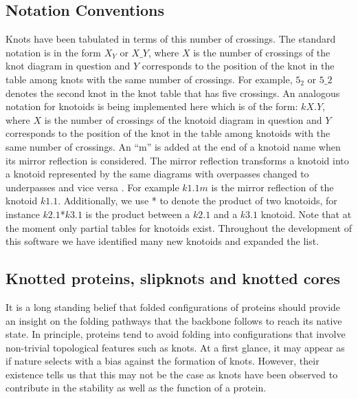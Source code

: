 \subsection{\label{sec:theory:notations}Notation Conventions}
Knots have been tabulated in terms of this number of crossings\cite{Rolfsen1976, Adams}. The standard notation is in the form $X_Y$ or $X\_ Y$, where $X$ is the number of crossings of the knot diagram in question and $Y$ corresponds to the position of the knot in the table among knots with the same number of crossings. For example, $5_2$ or $5\_2$ denotes the second knot in the knot table that has five crossings. An analogous notation for knotoids is being implemented here which is of the form: $kX.Y$, where $X$ is the number of crossings of the knotoid diagram in question and $Y$ corresponds to the position of the knot in the table among knotoids with the same number of crossings.
An ``m'' is added at the end of a knotoid name when its mirror reflection is considered. The mirror reflection
transforms a knotoid into a knotoid represented by the same diagrams with overpasses changed to underpasses and vice versa \cite{turaev}.
For example $k1.1m$ is the mirror reflection of the knotoid $k1.1$. Additionally, we use * to denote the product of two knotoids, for instance $k2.1$*$k3.1$ is the product between a $k2.1$ and a $k3.1$ knotoid.
Note that at the moment only partial tables for knotoids exist\cite{bartholomew}. Throughout the development of this software we have identified many new knotoids and expanded the list.

\subsection{\label{sec:theory:knottedcore}Knotted proteins, slipknots and knotted cores}

It is a long standing belief that folded configurations of proteins should provide an insight on the folding pathways that the backbone follows to reach its native state\cite{Crippen74, Connolly80}. In principle, proteins tend to avoid folding into configurations that involve non-trivial topological features such as knots. At a first glance, it may appear as if nature selects with a bias against the formation of knots. However, their existence\cite{taylor2000} tells us that this may not be the case as knots have been observed to contribute in the stability as well as the function of a protein.

